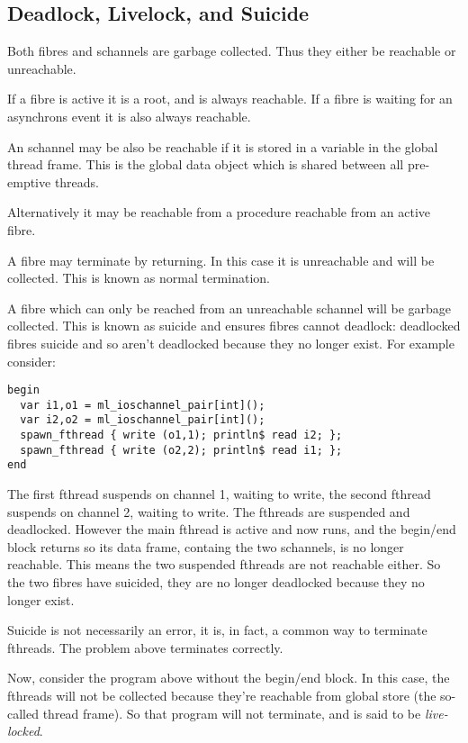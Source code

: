 \documentclass[oneside]{book}
\begin{document}
{\subsection{Deadlock, Livelock, and Suicide}
Both fibres and schannels are garbage collected. Thus they
either be reachable or unreachable.

If a fibre is active it is a root, and is always 
reachable. If a fibre is waiting for an asynchrons event
it is also always reachable.

An schannel may be also be reachable if it is stored in a variable
in the global thread frame. This is the global data object which is
shared between all pre-emptive threads.

Alternatively it may be reachable from a procedure reachable
from an active fibre.

A fibre may terminate by returning. In this case it is unreachable
and will be collected. This is known as normal termination.

A fibre which can only be reached from an unreachable schannel
will be garbage collected. This is known as suicide and
ensures fibres cannot deadlock: deadlocked fibres suicide
and so aren't deadlocked because they no longer exist.
For example consider:

\begin{verbatim}
begin 
  var i1,o1 = ml_ioschannel_pair[int]();
  var i2,o2 = ml_ioschannel_pair[int]();
  spawn_fthread { write (o1,1); println$ read i2; };
  spawn_fthread { write (o2,2); println$ read i1; };
end
\end{verbatim}

The first fthread suspends on channel 1, waiting to write,
the second fthread suspends on channel 2, waiting to write.
The fthreads are suspended and deadlocked. However the main
fthread is active and now runs, and the begin/end block
returns so its data frame, containg the two schannels,
is no longer reachable. This means the two suspended
fthreads are not reachable either. So the two fibres
have suicided, they are no longer deadlocked because
they no longer exist.

Suicide is not necessarily an error, it is, in fact, a common
way to terminate fthreads. The problem above terminates correctly.

Now, consider the program above without the begin/end block.
In this case, the fthreads will not be collected because
they're reachable from global store (the so-called thread frame).
So that program will not terminate, and is said to be 
{\em live-locked}.

}
\end{document}
